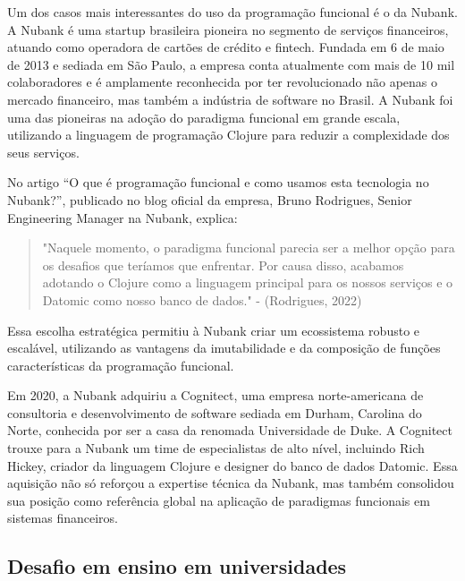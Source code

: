 Um dos casos mais interessantes do uso da programação funcional é o da Nubank. A Nubank é uma startup brasileira pioneira no segmento de serviços financeiros, atuando como operadora de cartões de crédito e fintech. Fundada em 6 de maio de 2013 e sediada em São Paulo, a empresa conta atualmente com mais de 10 mil colaboradores e é amplamente reconhecida por ter revolucionado não apenas o mercado financeiro, mas também a indústria de software no Brasil. A Nubank foi uma das pioneiras na adoção do paradigma funcional em grande escala, utilizando a linguagem de programação Clojure para reduzir a complexidade dos seus serviços.

No artigo “O que é programação funcional e como usamos esta tecnologia no Nubank?”, publicado no blog oficial da empresa, Bruno Rodrigues, Senior Engineering Manager na Nubank, explica: 

\begin{quote}
 "Naquele momento, o paradigma funcional parecia ser a melhor opção para os desafios que teríamos que enfrentar. Por causa disso, acabamos adotando o Clojure como a linguagem principal para os nossos serviços e o Datomic como nosso banco de dados." - (Rodrigues, 2022)
\end{quote}
 
 Essa escolha estratégica permitiu à Nubank criar um ecossistema robusto e escalável, utilizando as vantagens da imutabilidade e da composição de funções características da programação funcional.

Em 2020, a Nubank adquiriu a Cognitect, uma empresa norte-americana de consultoria e desenvolvimento de software sediada em Durham, Carolina do Norte, conhecida por ser a casa da renomada Universidade de Duke. A Cognitect trouxe para a Nubank um time de especialistas de alto nível, incluindo Rich Hickey, criador da linguagem Clojure e designer do banco de dados Datomic. Essa aquisição não só reforçou a expertise técnica da Nubank, mas também consolidou sua posição como referência global na aplicação de paradigmas funcionais em sistemas financeiros.

\subsection{Desafio em ensino em universidades}

